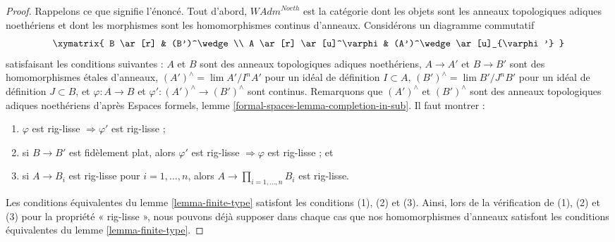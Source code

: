 \begin{proof}
Rappelons ce que signifie l'énoncé. Tout d'abord, 
$\textit{WAdm}^{Noeth}$ est la catégorie dont les objets sont les
anneaux topologiques adiques noethériens et dont les morphismes sont les
homomorphismes continus d'anneaux. Considérons un diagramme commutatif
$$
\xymatrix{
B \ar[r] & (B')^\wedge \\
A \ar[r] \ar[u]^\varphi & (A')^\wedge \ar[u]_{\varphi'}
}
$$
satisfaisant les conditions suivantes :
$A$ et $B$ sont des anneaux topologiques adiques noethériens,
$A \to A'$ et $B \to B'$ sont des homomorphismes étales d'anneaux,
$(A')^\wedge = \lim A'/I^nA'$ pour un idéal de définition $I \subset A$,
$(B')^\wedge = \lim B'/J^nB'$ pour un idéal de définition $J \subset B$, et
$\varphi : A \to B$ et $\varphi' : (A')^\wedge \to (B')^\wedge$
sont continus. Remarquons que $(A')^\wedge$ et $(B')^\wedge$ sont des
anneaux topologiques adiques noethériens d'après
Espaces formels, lemme \ref{formal-spaces-lemma-completion-in-sub}.
Il faut montrer :
\begin{enumerate}
\item $\varphi$ est rig-lisse $\Rightarrow \varphi'$ est rig-lisse ;
\item si $B \to B'$ est fidèlement plat, alors $\varphi'$ est rig-lisse
$\Rightarrow \varphi$ est rig-lisse ; et
\item si $A \to B_i$ est rig-lisse pour $i = 1, \ldots, n$, alors
$A \to \prod_{i = 1, \ldots, n} B_i$ est rig-lisse.
\end{enumerate}
Les conditions équivalentes du lemme \ref{lemma-finite-type} satisfont
les conditions (1), (2) et (3).
Ainsi, lors de la vérification de (1), (2) et (3) pour la propriété
« rig-lisse », nous pouvons déjà supposer dans chaque cas que nos
homomorphismes d'anneaux satisfont les conditions équivalentes du
lemme \ref{lemma-finite-type}.


\end{proof}
